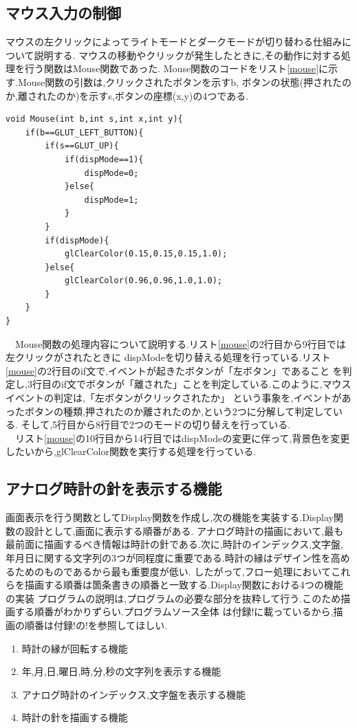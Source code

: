 \documentclass[a4j]{jarticle}
\begin{document}
    \subsection{マウス入力の制御}
    マウスの左クリックによってライトモードとダークモードが切り替わる仕組みについて説明する.
    マウスの移動やクリックが発生したときに,その動作に対する処理を行う関数はMouse関数であった.
    Mouse関数のコードをリスト\ref{mouse}に示す.Mouse関数の引数は,クリックされたボタンを示すb,
    ボタンの状態(押されたのか,離されたのか)を示すs,ボタンの座標(x,y)の4つである.
    \begin{lstlisting}[basicstyle=\ttfamily\footnotesize, frame=single,label=mouse,caption=Mouse関数]
void Mouse(int b,int s,int x,int y){
    if(b==GLUT_LEFT_BUTTON){
        if(s==GLUT_UP){
            if(dispMode==1){
                dispMode=0;
            }else{
                dispMode=1;
            }
        }
        if(dispMode){
            glClearColor(0.15,0.15,0.15,1.0);
        }else{
            glClearColor(0.96,0.96,1.0,1.0);
        }
    }
}
            \end{lstlisting}
      　Mouse関数の処理内容について説明する.リスト\ref{mouse}の2行目から9行目では左クリックがされたときに
      dispModeを切り替える処理を行っている.リスト\ref{mouse}の2行目のif文で,イベントが起きたボタンが「左ボタン」であること
      を判定し,3行目のif文でボタンが「離された」ことを判定している.このように,マウスイベントの判定は,「左ボタンがクリックされたか」
      という事象を,イベントがあったボタンの種類,押されたのか離されたのか,という2つに分解して判定している.
      そして,5行目から8行目で2つのモードの切り替えを行っている.\\
      　リスト\ref{mouse}の10行目から14行目ではdispModeの変更に伴って,背景色を変更したいから,glClearColor関数を実行する処理を行っている.

    \subsection{アナログ時計の針を表示する機能}
    画面表示を行う関数としてDisplay関数を作成し,次の機能を実装する.Display関数の設計として,画面に表示する順番がある.
    アナログ時計の描画において,最も最前面に描画するべき情報は時計の針である.次に,時計のインデックス,文字盤,
    年月日に関する文字列の3つが同程度に重要である.時計の縁はデザイン性を高めるためのものであるから最も重要度が低い.
    したがって,フロー処理においてこれらを描画する順番は箇条書きの順番と一致する.Display関数における4つの機能の実装
    プログラムの説明は,プログラムの必要な部分を抜粋して行う.このため描画する順番がわかりずらい.プログラムソース全体
    は付録!に載っているから,描画の順番は付録!の!を参照してほしい.
    \begin{enumerate}
      \item 時計の縁が回転する機能 
      \item 年,月,日,曜日,時,分,秒の文字列を表示する機能
      \item アナログ時計のインデックス,文字盤を表示する機能
      \item 時計の針を描画する機能 
    \end{enumerate}
\end{document}
